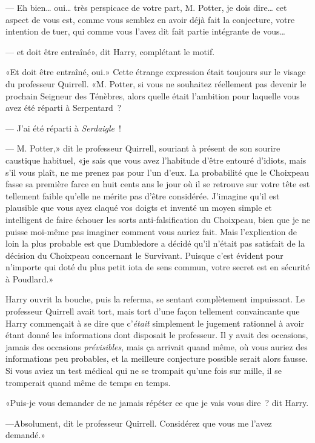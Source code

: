 --- Eh bien… oui… très perspicace de votre part, M. Potter, je dois dire… cet aspect de vous est, comme vous semblez en avoir déjà fait la conjecture, votre intention de tuer, qui comme vous l'avez dit fait partie intégrante de vous…

--- et doit être entraîné», dit Harry, complétant le motif.

«Et doit être entraîné, oui.» Cette étrange expression était toujours sur le visage du professeur Quirrell. «M. Potter, si vous ne souhaitez réellement pas devenir le prochain Seigneur des Ténèbres, alors quelle était l'ambition pour laquelle vous avez été réparti à Serpentard~?

--- J'ai été réparti à \emph{Serdaigle}~!

--- M. Potter,» dit le professeur Quirrell, souriant à présent de son sourire caustique habituel, «je sais que vous avez l'habitude d'être entouré d'idiots, mais s'il vous plaît, ne me prenez pas pour l'un d'eux. La probabilité que le Choixpeau fasse sa première farce en huit cents ans le jour où il se retrouve sur votre tête est tellement faible qu'elle ne mérite pas d'être considérée. J'imagine qu'il est plausible que vous ayez claqué vos doigts et inventé un moyen simple et intelligent de faire échouer les sorts anti-falsification du Choixpeau, bien que je ne puisse moi-même pas imaginer comment vous auriez fait. Mais l'explication de loin la plus probable est que Dumbledore a décidé qu'il n'était pas satisfait de la décision du Choixpeau concernant le Survivant. Puisque c'est évident pour n'importe qui doté du plus petit iota de sens commun, votre secret est en sécurité à Poudlard.»

Harry ouvrit la bouche, puis la referma, se sentant complètement impuissant. Le professeur Quirrell avait tort, mais tort d'une façon tellement convaincante que Harry commençait à se dire que c'\emph{était} simplement le jugement rationnel à avoir étant donné les informations dont disposait le professeur. Il y avait des occasions, jamais des occasions \emph{prévisibles}, mais ça arrivait quand même, où vous auriez des informations peu probables, et la meilleure conjecture possible serait alors fausse. Si vous aviez un test médical qui ne se trompait qu'une fois sur mille, il se tromperait quand même de temps en temps.

«Puis-je vous demander de ne jamais répéter ce que je vais vous dire~? dit Harry.

---Absolument, dit le professeur Quirrell. Considérez que vous me l'avez demandé.»

